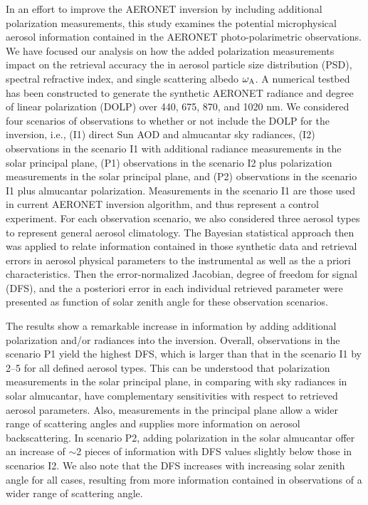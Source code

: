 In an effort to improve the AERONET inversion by including additional
polarization measurements, this study examines the potential
microphysical aerosol information contained in the AERONET
photo-polarimetric observations. We have focused our analysis on how the
added polarization measurements impact on the retrieval accuracy the in
aerosol particle size distribution (PSD), spectral refractive index, and
single scattering albedo $\omega_\text{A}$. A numerical testbed has been constructed
to generate the synthetic AERONET radiance and degree of linear
polarization (DOLP) over 440, 675, 870, and 1020 nm. We considered four
scenarios of observations to whether or not include the DOLP for the
inversion, i.e., (I1) direct Sun AOD and almucantar sky radiances, (I2)
observations in the scenario I1 with additional radiance measurements in
the solar principal plane, (P1) observations in the scenario I2 plus
polarization measurements in the solar principal plane, and (P2)
observations in the scenario I1 plus almucantar polarization.
Measurements in the scenario I1 are those used in current AERONET
inversion algorithm, and thus represent a control experiment. For each
observation scenario, we also considered three aerosol types to
represent general aerosol climatology.  The Bayesian statistical
approach then was applied to relate information contained in those
synthetic data and retrieval errors in aerosol physical parameters to
the instrumental as well as the a priori characteristics. Then the
error-normalized Jacobian, degree of freedom for signal (DFS), and the a
posteriori error in each individual retrieved parameter were presented
as function of solar zenith angle for these observation scenarios. 

The results show a remarkable increase in information by adding
additional polarization and/or radiances into the inversion. Overall,
observations in the scenario P1 yield the highest DFS, which is larger
than that in the scenario I1 by 2--5 for all defined aerosol types. This
can be understood that polarization measurements in the solar principal
plane, in comparing with sky radiances in solar almucantar, have
complementary sensitivities with respect to retrieved aerosol
parameters. Also, measurements in the principal plane allow a wider
range of scattering angles and supplies more information on aerosol
backscattering. In scenario P2, adding polarization in the solar
almucantar offer an increase of $\sim$2 pieces of information with DFS values
slightly below those in scenarios I2. We also note that the DFS
increases with increasing solar zenith angle for all cases, resulting
from more information contained in observations of a wider range of
scattering angle.

